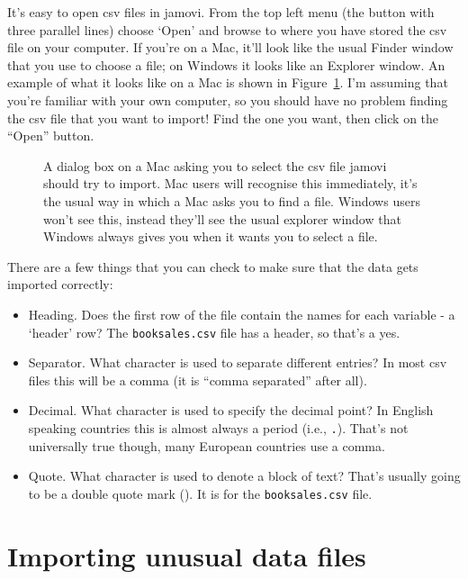 It's easy to open csv files in jamovi. From the top left menu (the button with three parallel lines) choose `Open' and browse to where you have stored the csv file on your computer. If you're on a Mac, it'll look like the usual Finder window that you use to choose a file; on Windows it looks like an Explorer window. An example of what it looks like on a Mac is shown in Figure~\ref{fig:fileopen}. I'm assuming that you're familiar with your own computer, so you should have no problem finding the csv file that you want to import! Find the one you want, then click on the ``Open'' button. 

\begin{figure}[t]
\begin{center}
\caption{A dialog box on a Mac asking you to select the csv file jamovi should try to import. Mac users will recognise this immediately, it's the usual way in which a Mac asks you to find a file. Windows users won't see this, instead they'll see the usual explorer window that Windows always gives you when it wants you to select a file.}
\HR
\label{fig:fileopen}
\end{center}
\end{figure} 

There are a few things that you can check to make sure that the data gets imported correctly: 

\begin{itemize}
\item Heading. Does the first row of the file contain the names for each variable - a `header' row? The \texttt{booksales.csv} file has a header, so that's a yes.
\item Separator. What character is used to separate different entries? In most csv files this will be a comma (it is ``comma separated'' after all).
\item Decimal. What character is used to specify the decimal point? In English speaking countries this is almost always a period (i.e., \texttt{.}). That's not universally true though, many European countries use a comma. 
\item Quote. What character is used to denote a block of text? That's usually going to be a double quote mark (). It is for the \texttt{booksales.csv} file.
\end{itemize}


\section{Importing unusual data files~\label{sec:importing}}

